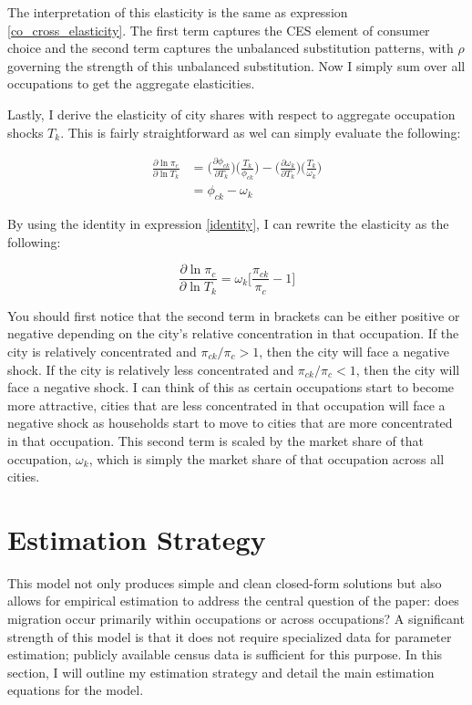 \documentclass[10pt]{article}
\begin{document}
The interpretation of this elasticity is the same as expression \ref{co_cross_elasticity}. The first term captures the CES element of consumer choice and the second term captures the unbalanced substitution patterns, with $\rho$ governing the strength of this unbalanced substitution. Now I simply sum over all occupations to get the aggregate elasticities.

Lastly, I derive the elasticity of city shares with respect to aggregate occupation shocks $T_k$. This is fairly straightforward as wel can simply evaluate the following:

\begin{align*}
    \frac{\partial\ln{\pi_{c}}}{\partial\ln{T_{k}}} & = \Big(\frac{\partial{\phi_{ck}}}{\partial{T_{k}}}\Big)\Big(\frac{T_{k}}{\phi_{ck}}\Big) - \Big(\frac{\partial{\omega_{k}}}{\partial{T_{k}}}\Big)\Big(\frac{T_{k}}{\omega_{k}}\Big) \\ &= \phi_{ck}-\omega_{k}
\end{align*}

By using the identity in expression \ref{identity}, I can rewrite the elasticity as the following:

\begin{equation}
    \frac{\partial\ln{\pi_{c}}}{\partial\ln{T_{k}}} = {\omega_{k}}\Bigg[\frac{\pi_{ck}}{\pi_{c}}-1\Bigg]
    \label{city_occupation_elasticity}
\end{equation}

You should first notice that the second term in brackets can be either positive or negative depending on the city's relative concentration in that occupation. If the city is relatively concentrated and $\pi_{ck} / \pi_c > 1$, then the city will face a negative shock. If the city is relatively less concentrated and $\pi_{ck} / \pi_c < 1$, then the city will face a negative shock. I can think of this as certain occupations start to become more attractive, cities that are less concentrated in that occupation will face a negative shock as households start to move to cities that are more concentrated in that occupation. This second term is scaled by the market share of that occupation, $\omega_k$, which is simply the market share of that occupation across all cities.

\section{Estimation Strategy}

This model not only produces simple and clean closed-form solutions but also allows for empirical estimation to address the central question of the paper: does migration occur primarily within occupations or across occupations? A significant strength of this model is that it does not require specialized data for parameter estimation; publicly available census data is sufficient for this purpose. In this section, I will outline my estimation strategy and detail the main estimation equations for the model.
\end{document}
